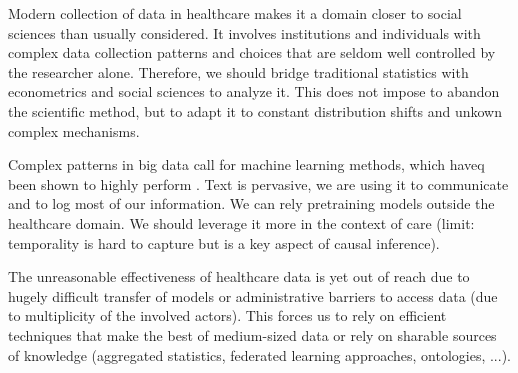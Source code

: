 \documentclass[french,12pt,twoside,a4paper]{book}
\begin{document}
Modern collection of data in healthcare makes it a domain closer to social
sciences than usually considered. It involves institutions and individuals with
complex data collection patterns and choices that are seldom well controlled by
the researcher alone. Therefore, we should bridge traditional
statistics with econometrics and social sciences to analyze it. This does not
impose to abandon the scientific method, but to adapt it to constant
distribution shifts and unkown complex mechanisms.

Complex patterns in big data call for machine learning methods, which haveq been shown to
highly perform . Text is pervasive, we are using it to communicate and to log
most of our information. We can rely pretraining models outside the healthcare
domain. We should leverage it more in the context of care (limit: temporality is
hard to capture but is a key aspect of causal inference).

The unreasonable effectiveness of healthcare data is yet out of reach due to
hugely difficult transfer of models or administrative barriers to access data
(due to multiplicity of the involved actors). This forces us to rely on
efficient techniques that make the best of medium-sized data or rely on sharable
sources of knowledge (aggregated statistics, federated learning approaches,
ontologies, ...).

\clearpage
%
%
%
\begin{multicols}{2}
  \printbibliography
\end{multicols}
\end{document}
